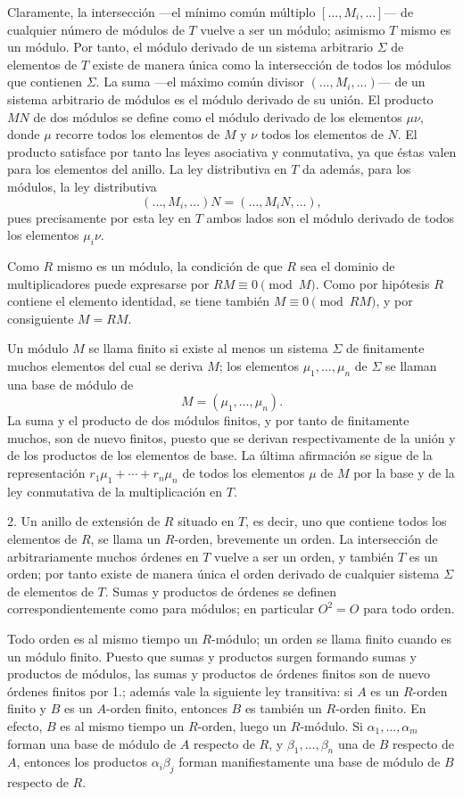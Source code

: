 \documentclass[11pt]{article}
\begin{document}
Claramente, la intersección ---el mínimo común múltiplo $[\ldots,M_i,\ldots]$--- de cualquier número de módulos de $T$ vuelve a ser un módulo; asimismo $T$ mismo es un módulo. Por tanto, el módulo derivado de un sistema arbitrario $\Sigma$ de elementos de $T$ existe de manera única como la intersección de todos los módulos que contienen $\Sigma$. La suma ---el máximo común divisor $(\ldots,M_i,\ldots)$--- de un sistema arbitrario de módulos es el módulo derivado de su unión. El producto $MN$ de dos módulos se define como el módulo derivado de los elementos $\mu\nu$, donde $\mu$ recorre todos los elementos de $M$ y $\nu$ todos los elementos de $N$. El producto satisface por tanto las leyes asociativa y conmutativa, ya que éstas valen para los elementos del anillo. La ley distributiva en $T$ da además, para los módulos, la ley distributiva
\[
        (\ldots,M_i,\ldots)N=(\ldots,M_iN,\ldots),
\]
pues precisamente por esta ley en $T$ ambos lados son el módulo derivado de todos los elementos $\mu_i\nu$.

Como $R$ mismo es un módulo, la condición de que $R$ sea el dominio de multiplicadores puede expresarse por $RM\equiv0\pmod M$. Como por hipótesis $R$ contiene el elemento identidad, se tiene también $M\equiv0\pmod{RM}$, y por consiguiente $M=RM$.

Un módulo $M$ se llama finito si existe al menos un sistema $\Sigma$ de finitamente muchos elementos del cual se deriva $M$; los elementos $\mu_1,\ldots,\mu_n$ de $\Sigma$ se llaman una base de módulo de
\[
        M=(\mu_1,\ldots,\mu_n).
\]
La suma y el producto de dos módulos finitos, y por tanto de finitamente muchos, son de nuevo finitos, puesto que se derivan respectivamente de la unión y de los productos de los elementos de base. La última afirmación se sigue de la representación $r_1\mu_1+\cdots+r_n\mu_n$ de todos los elementos $\mu$ de $M$ por la base y de la ley conmutativa de la multiplicación en $T$.

2. Un anillo de extensión de $R$ situado en $T$, es decir, uno que contiene todos los elementos de $R$, se llama un $R$-orden, brevemente un orden. La intersección de arbitrariamente muchos órdenes en $T$ vuelve a ser un orden, y también $T$ es un orden; por tanto existe de manera única el orden derivado de cualquier sistema $\Sigma$ de elementos de $T$. Sumas y productos de órdenes se definen correspondientemente como para módulos; en particular $O^2=O$ para todo orden.

Todo orden es al mismo tiempo un $R$-módulo; un orden se llama finito cuando es un módulo finito. Puesto que sumas y productos surgen formando sumas y productos de módulos, las sumas y productos de órdenes finitos son de nuevo órdenes finitos por 1.; además vale la siguiente ley transitiva: si $A$ es un $R$-orden finito y $B$ es un $A$-orden finito, entonces $B$ es también un $R$-orden finito. En efecto, $B$ es al mismo tiempo un $R$-orden, luego un $R$-módulo. Si $\alpha_1,\ldots,\alpha_m$ forman una base de módulo de $A$ respecto de $R$, y $\beta_1,\ldots,\beta_n$ una de $B$ respecto de $A$, entonces los productos $\alpha_i\beta_j$ forman manifiestamente una base de módulo de $B$ respecto de $R$.
\end{document}
